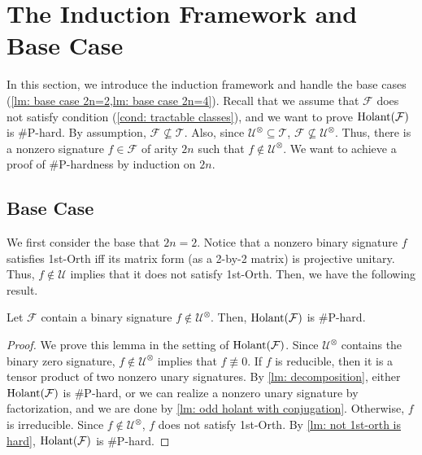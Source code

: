 \section{The Induction Framework and Base Case}\label{sec-induction}
    In this section, we introduce the induction framework and handle the base cases (\cref{lm: base case 2n=2,lm: base case 2n=4}).
    Recall that we assume that ${\mathcal{F}}$ does not satisfy condition \rm{(\ref{cond: tractable classes})}, and we want to prove $\operatorname{Holant}(\mathcal{F})$ is \#P-hard.
    By assumption, ${\mathcal{F}}\not\subseteq \mathscr{T}$.
    Also, since  ${\mathcal{U}}^{\otimes}\subseteq \mathscr{T}$, ${\mathcal{F}}\not\subseteq {\mathcal{U}}^{\otimes}$.
    Thus, there is a nonzero signature ${f}\in {\mathcal{F}}$ of arity $2n$ such that ${f}\notin {\mathcal{U}}^{\otimes}$.
    We want to achieve a proof of  \#P-hardness by induction on $2n$. 
    
\subsection{Base Case}\label{subsec: Base Case}
    We first consider the base that $2n=2$.
    Notice that a nonzero binary signature  ${f}$ satisfies {\sc 1st-Orth} iff its matrix form (as a 2-by-2 matrix) is projective unitary.
    Thus, ${f}\notin{\mathcal{U}}$ implies that it does not satisfy {\sc 1st-Orth}.
    Then, we have the following result.

\begin{lemma}\label{lm: base case 2n=2}
    Let $\mathcal F$ contain a binary signature $f\notin \mathcal{U}^{\otimes}$.
    Then, $\operatorname{Holant}(\mathcal{F})$ is \#P-hard.
\end{lemma}

\begin{proof}
    We prove this lemma in the setting of $\operatorname{Holant}(\mathcal{F})$.
    Since ${\mathcal{U}}^{\otimes}$ contains the binary zero signature, $f\notin {\mathcal{U}}^{\otimes}$ implies that $f\not\equiv 0$.
    If $f$ is reducible, then it is a tensor product of two nonzero unary signatures. 
    By \cref{lm: decomposition}, either $\operatorname{Holant}(\mathcal{F})$ is \#P-hard, or we can realize a nonzero unary signature by factorization, and we are done by \cref{lm: odd holant with conjugation}.
    Otherwise, $f$ is irreducible. 
    Since $f\notin \mathcal{U}^{\otimes}$, $f$ does not satisfy {\sc 1st-Orth}. 
    By \cref{lm: not 1st-orth is hard},  $\operatorname{Holant}(\mathcal{F})$ is \#P-hard.
\end{proof}

